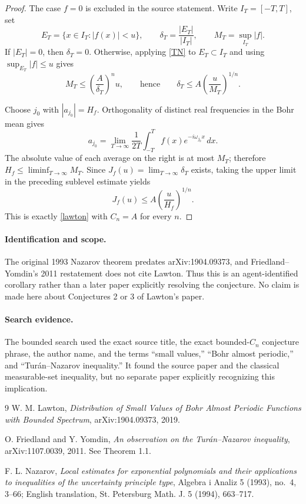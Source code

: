 \documentclass[11pt]{article}
\begin{document}
\begin{proof}
The case $f=0$ is excluded in the source statement.  Write
$I_T=[-T,T]$, set
\[
 E_T=\{x\in I_T:|f(x)|<u\},\qquad
 \delta_T=\frac{|E_T|}{|I_T|},\qquad
 M_T=\sup_{I_T}|f|.
\]
If $|E_T|=0$, then $\delta_T=0$.  Otherwise, applying
\eqref{TN} to $E_T\subset I_T$ and using $\sup_{E_T}|f|\le u$ gives
\[
 M_T\le \left(\frac A{\delta_T}\right)^n u,
 \qquad\text{hence}\qquad
 \delta_T\le A\left(\frac u{M_T}\right)^{1/n}.
\]

Choose $j_0$ with $|a_{j_0}|=H_f$.  Orthogonality of distinct real
frequencies in the Bohr mean gives
\[
 a_{j_0}=\lim_{T\to\infty}\frac1{2T}
 \int_{-T}^{T}f(x)e^{-i\omega_{j_0}x}\,dx.
\]
The absolute value of each average on the right is at most $M_T$; therefore
$H_f\le\liminf_{T\to\infty}M_T$.  Since $J_f(u)=\lim_{T\to\infty}\delta_T$
exists, taking the upper limit in the preceding sublevel estimate yields
\[
 J_f(u)\le A\left(\frac u{H_f}\right)^{1/n}.
\]
This is exactly \eqref{lawton} with $C_n=A$ for every $n$.
\end{proof}

\paragraph{Identification and scope.}
The original 1993 Nazarov theorem predates arXiv:1904.09373, and
Friedland--Yomdin's 2011 restatement does not cite Lawton.  Thus this is an
agent-identified corollary rather than a later paper explicitly resolving the
conjecture.  No claim is made here about Conjectures 2 or 3 of Lawton's paper.

\paragraph{Search evidence.}
The bounded search used the exact source title, the exact bounded-$C_n$
conjecture phrase, the author name, and the terms ``small values,''
``Bohr almost periodic,'' and ``Tur\'an--Nazarov inequality.''  It found the
source paper and the classical measurable-set inequality, but no separate
paper explicitly recognizing this implication.

\begin{thebibliography}{9}
W. M. Lawton,
\emph{Distribution of Small Values of Bohr Almost Periodic Functions with
Bounded Spectrum}, arXiv:1904.09373, 2019.

O. Friedland and Y. Yomdin,
\emph{An observation on the Tur\'an--Nazarov inequality},
arXiv:1107.0039, 2011.  See Theorem 1.1.

F. L. Nazarov,
\emph{Local estimates for exponential polynomials and their applications to
inequalities of the uncertainty principle type},
Algebra i Analiz 5 (1993), no.~4, 3--66;
English translation, St. Petersburg Math. J. 5 (1994), 663--717.
\end{thebibliography}
\end{document}
